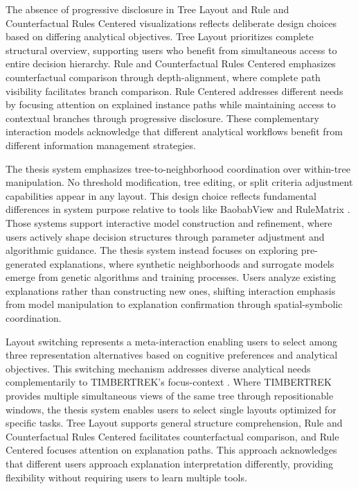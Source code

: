 The absence of progressive disclosure in Tree Layout and Rule and Counterfactual Rules Centered visualizations reflects deliberate design choices based on differing analytical objectives. Tree Layout prioritizes complete structural overview, supporting users who benefit from simultaneous access to entire decision hierarchy. Rule and Counterfactual Rules Centered emphasizes counterfactual comparison through depth-alignment, where complete path visibility facilitates branch comparison. Rule Centered addresses different needs by focusing attention on explained instance paths while maintaining access to contextual branches through progressive disclosure. These complementary interaction models acknowledge that different analytical workflows benefit from different information management strategies.

The thesis system emphasizes tree-to-neighborhood coordination over within-tree manipulation. No threshold modification, tree editing, or split criteria adjustment capabilities appear in any layout. This design choice reflects fundamental differences in system purpose relative to tools like BaobabView \cite{elzen2011baobabview} and RuleMatrix \cite{ming2019rulematrix}. Those systems support interactive model construction and refinement, where users actively shape decision structures through parameter adjustment and algorithmic guidance. The thesis system instead focuses on exploring pre-generated explanations, where synthetic neighborhoods and surrogate models emerge from genetic algorithms and training processes. Users analyze existing explanations rather than constructing new ones, shifting interaction emphasis from model manipulation to explanation confirmation through spatial-symbolic coordination.

Layout switching represents a meta-interaction enabling users to select among three representation alternatives based on cognitive preferences and analytical objectives. This switching mechanism addresses diverse analytical needs complementarily to TIMBERTREK's focus-context \cite{wang2022timbertrek}. Where TIMBERTREK provides multiple simultaneous views of the same tree through repositionable windows, the thesis system enables users to select single layouts optimized for specific tasks. Tree Layout supports general structure comprehension, Rule and Counterfactual Rules Centered facilitates counterfactual comparison, and Rule Centered focuses attention on explanation paths. This approach acknowledges that different users approach explanation interpretation differently, providing flexibility without requiring users to learn multiple tools.

